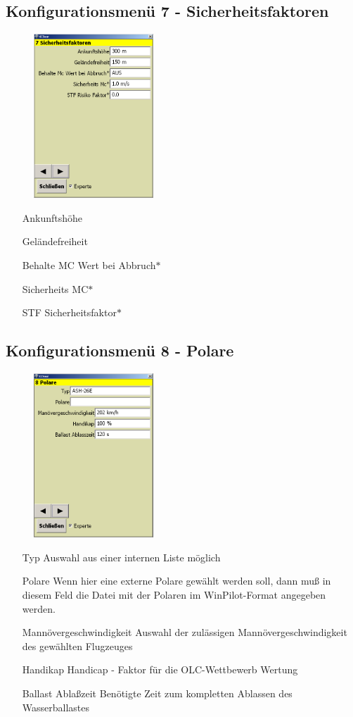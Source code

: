 \subsection{Konfigurationsmenü 7 - Sicherheitsfaktoren}\label{Konfig7}
\begin{figure}
\includegraphics[width=4.5cm]{Bilder/Konfig7Sicherheistfaktoren.png}
\end{figure}
\begin{enumerate}
\item[Ankunftshöhe]
\item[Geländefreiheit]
\item[Behalte \textsf{MC} Wert bei Abbruch$\ast$]
\item[Sicherheits \textsf{MC}$\ast$]
\item[STF Sicherheitsfaktor$\ast$]
\end{enumerate}


\subsection{Konfigurationsmenü 8 - Polare}\label{Konfig8}
\begin{figure}
\includegraphics[width=4.5cm]{Bilder/Konfig8Polare.png}
\end{figure}
\begin{enumerate}
\item[Typ] Auswahl aus einer internen Liste möglich
\item[Polare] Wenn hier eine externe Polare gewählt werden soll, dann muß in diesem Feld die Datei mit der Polaren im \textsf{WinPilot}-Format angegeben werden.
\item[Mannövergeschwindigkeit] Auswahl der zulässigen Mannövergeschwindigkeit des gewählten Flugzeuges
\item[Handikap] Handicap - Faktor für die \textsf{OLC}-Wettbewerb Wertung
\item[Ballast Ablaßzeit] Benötigte Zeit zum kompletten Ablassen des Wasserballastes
\end{enumerate}


